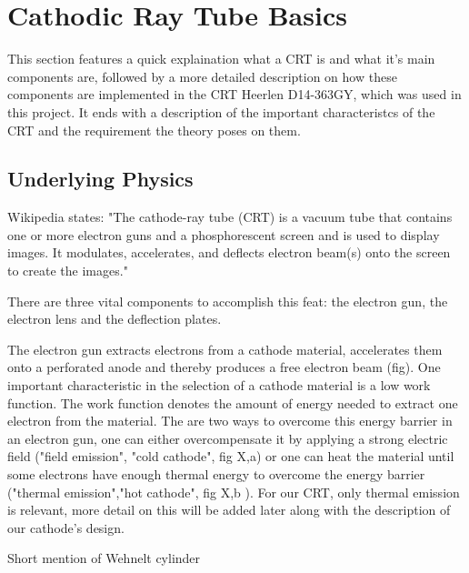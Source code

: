 
\chapter{Cathodic Ray Tube Basics}

This section features a quick explaination what a CRT is and what it's main components are, followed by a more detailed description on how these components are implemented in the CRT Heerlen D14-363GY, which was used in this project. It ends with a description of the important characteristcs of the CRT and the requirement the theory poses on them.

\section{Underlying Physics}

Wikipedia states: "The cathode-ray tube (CRT) is a vacuum tube that contains one or more electron guns and a phosphorescent screen and is used to display images. It modulates, accelerates, and deflects electron beam(s) onto the screen to create the images."

There are three vital components to accomplish this feat: the electron gun, the electron lens and the deflection plates. 

The electron gun extracts electrons from a cathode material, accelerates them onto a perforated anode and thereby produces a free electron beam (fig). One important characteristic in the selection of a cathode material is a low work function. The work function denotes the amount of energy needed to extract one electron from the material. The are two ways to overcome this energy barrier in an electron gun, one can either overcompensate it by applying a strong electric field ("field emission", "cold cathode", fig X,a)  or one can heat the material until some electrons have enough thermal energy to overcome the energy barrier ("thermal emission","hot cathode", fig X,b ). For our CRT, only thermal emission is relevant, more detail on this will be added later along with the description of our cathode's design. 

Short mention of Wehnelt cylinder  

